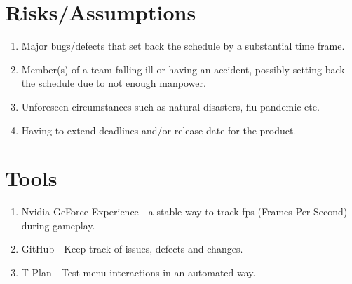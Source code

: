 \documentclass[a4paper, 10pt]{article}
\begin{document}
\section{Risks/Assumptions}
    \begin{enumerate}
        \item Major bugs/defects that set back the schedule by a substantial time frame.
        \item Member(s) of a team falling ill or having an accident, possibly setting back the schedule due to not enough manpower.
        \item Unforeseen circumstances such as natural disasters, flu pandemic etc.
        \item Having to extend deadlines and/or release date for the product.
    \end{enumerate}

\section{Tools}
    \begin{enumerate}
        \item Nvidia GeForce Experience - a stable way to track fps (Frames Per Second) during gameplay.
        \item GitHub - Keep track of issues, defects and changes.
        \item T-Plan - Test menu interactions in an automated way.
    \end{enumerate}
\end{document}
